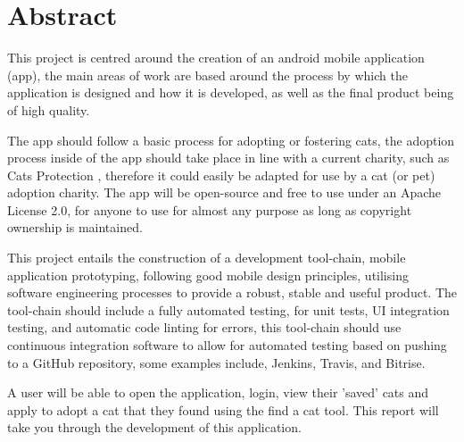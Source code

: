 \thispagestyle{empty}


\section*{\centering Abstract}

This project is centred around the creation of an android mobile application (app), the main areas of work are based around the process by which the application is designed and how it is developed, as well as the final product being of high quality.

The app should follow a basic process for adopting or fostering cats, the adoption process inside of the app should take place in line with a current charity, such as Cats Protection \cite{CATSPROTECTION}, therefore it could easily be adapted for use by a cat (or pet) adoption charity. The app will be open-source and free to use under an Apache License 2.0\cite{APACHE2LICENSE}, for anyone to use for almost any purpose as long as copyright ownership is maintained.

This project entails the construction of a development tool-chain, mobile application prototyping, following good mobile design principles, utilising software engineering processes to provide a robust, stable and useful product. The tool-chain should include a fully automated testing, for unit tests, UI integration testing, and automatic code linting for errors, this tool-chain should use continuous integration software to allow for automated testing based on pushing to a GitHub\cite{GITHUB} repository, some examples include, Jenkins\cite{JENKINS}, Travis\cite{TRAVIS}, and Bitrise\cite{BITRISE}.

A user will be able to open the application, login, view their 'saved' cats and apply to adopt a cat that they found using the find a cat tool. This report will take you through the development of this application.

